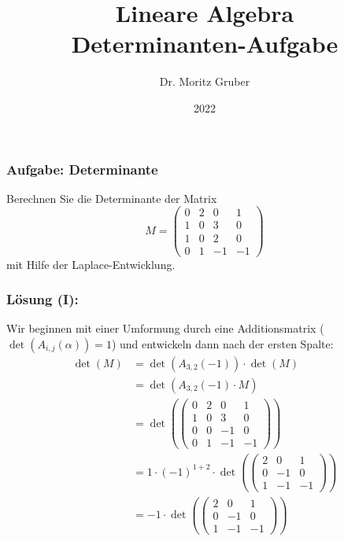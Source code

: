 

\title{Lineare Algebra\\[3mm] 
	\large Determinanten-Aufgabe
}
\author{Dr. Moritz Gruber} 
\date{2022}



%
\begin{frame}[plain] 
 \titlepage
\end{frame}
%
\begin{frame}\frametitle{Aufgabe: Determinante}
%
Berechnen Sie die Determinante der Matrix
$$
	M=\begin{pmatrix}
		0	& 2	&  0& 1	\\
		1	& 0	&  3	& 0	\\
		1	& 0	&  2	& 0\\
		0	& 1	&  -1	& -1	
	\end{pmatrix}
$$
mit Hilfe der Laplace-Entwicklung.

%
\end{frame}
%
%
\begin{frame}\frametitle{Lösung (I):}
%	
Wir beginnen mit einer Umformung durch eine Additionsmatrix ($\det(A_{i,j}(\alpha))=1$) und entwickeln dann nach der ersten Spalte:\pause
\begin{align*}
\det(M)&=\det(A_{3,2}(-1))\cdot \det(M)\\
&=\det(A_{3,2}(-1)\cdot M)\\
&=\det(\begin{pmatrix}
		0	& 2	&  0& 1	\\
		1	& 0	&  3	& 0	\\
		0	& 0	&  -1	& 0\\
		0	& 1	&  -1	& -1	
	\end{pmatrix})\\
&=1\cdot (-1)^{1+2}\cdot\det(\begin{pmatrix}
		 2	&  0& 1	\\
		 0	&  -1	& 0\\
		1	&  -1	& -1	
	\end{pmatrix})\\
&=-1\cdot\det(\begin{pmatrix}
		 2	&  0& 1	\\
		 0	&  -1	& 0\\
		1	&  -1	& -1	
	\end{pmatrix})\\
\end{align*}
\end{frame}
